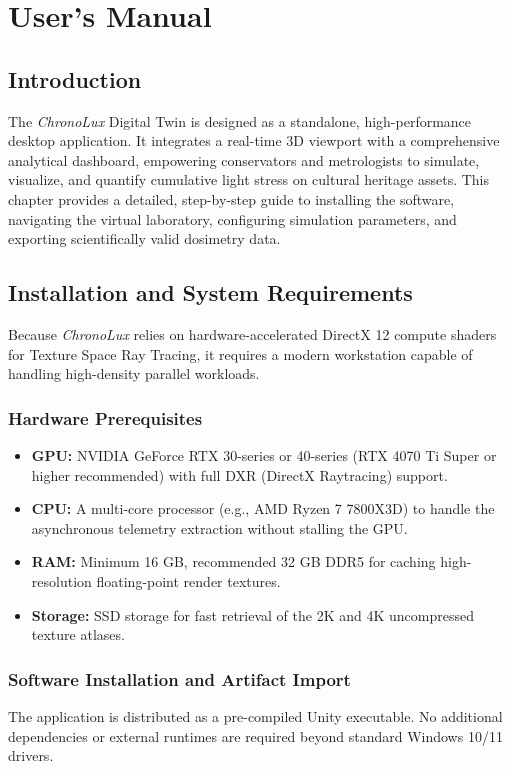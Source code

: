 \chapter{User's Manual}

\section{Introduction}

The \textit{ChronoLux} Digital Twin is designed as a standalone, high-performance desktop application. It integrates a real-time 3D viewport with a comprehensive analytical dashboard, empowering conservators and metrologists to simulate, visualize, and quantify cumulative light stress on cultural heritage assets. This chapter provides a detailed, step-by-step guide to installing the software, navigating the virtual laboratory, configuring simulation parameters, and exporting scientifically valid dosimetry data.

\section{Installation and System Requirements}

Because \textit{ChronoLux} relies on hardware-accelerated DirectX 12 compute shaders for Texture Space Ray Tracing, it requires a modern workstation capable of handling high-density parallel workloads.

\subsection{Hardware Prerequisites}
\begin{itemize}
    \item \textbf{GPU:} NVIDIA GeForce RTX 30-series or 40-series (RTX 4070 Ti Super or higher recommended) with full DXR (DirectX Raytracing) support.
    \item \textbf{CPU:} A multi-core processor (e.g., AMD Ryzen 7 7800X3D) to handle the asynchronous telemetry extraction without stalling the GPU.
    \item \textbf{RAM:} Minimum 16 GB, recommended 32 GB DDR5 for caching high-resolution floating-point render textures.
    \item \textbf{Storage:} SSD storage for fast retrieval of the 2K and 4K uncompressed texture atlases.
\end{itemize}

\subsection{Software Installation and Artifact Import}
The application is distributed as a pre-compiled Unity executable. No additional dependencies or external runtimes are required beyond standard Windows 10/11 drivers.

